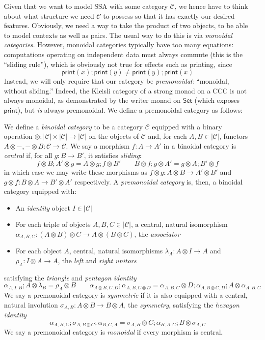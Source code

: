 \documentclass[acmsmall,screen,review]{acmart}
\newcommand{\mc}[1]{\ensuremath{\mathcal{#1}}}
\newcommand{\ms}[1]{\ensuremath{\mathsf{#1}}}
\begin{document}
Given that we want to model SSA with some category $\mc{C}$, we hence have to think about what
structure we need $\mc{C}$ to possess so that it has exactly our desired features. Obviously, we
need a way to take the product of two objects, to be able to model contexts as well as pairs.
% 
The usual way to do this is via \emph{monoidal categories}. 
%
However, monoidal categories typically have too many equations: 
%
computations operating on independent data must always commute (this is the ``sliding rule''), 
%
  which is obviously not true for effects such as printing, since
$$
\ms{print}(x) ; \ms{print}(y) \neq \ms{print}(y) ; \ms{print}(x)
$$
Instead, we will only require that our category be \emph{premonoidal}: ``monoidal, without
sliding.'' Indeed, the Kleisli category of a strong monad on a CCC is not always monoidal, as
demonstrated by the writer monad on $\ms{Set}$ (which exposes $\ms{print}$), but \emph{is} always
premonoidal. We define a premonoidal category as follows:
\begin{definition}
  We define a \emph{binoidal category} to be a category $\mc{C}$ equipped with a binary operation
  $\otimes : |\mc{C}| \times |\mc{C}| \to |\mc{C}|$ on the objects of $\mc{C}$ and, for each $A, B
  \in |\mc{C}|$, functors $A \otimes -, - \otimes B : \mc{C} \to \mc{C}$. We say a morphism $f : A
  \to A'$ in a binoidal category is \emph{central} if, for all $g : B \to B'$, it satisfies
  \emph{sliding}:
  $$
  f \otimes B ; A' \otimes g = A \otimes g ; f \otimes B' \qquad
  B \otimes f ; g \otimes A' = g \otimes A ; B' \otimes f
  $$
  in which case we may write these morphisms as $f \otimes g : A \otimes B \to A' \otimes B'$ and $g
  \otimes f : B \otimes A \to B' \otimes A'$ respectively. A \emph{premonoidal category} is, then, a
  binoidal category equipped with:
  \begin{itemize}
    \item An \emph{identity} object $I \in |\mc{C}|$
    \item For each triple of objects $A, B, C \in |\mc{C}|$, a central, natural isomorphism
    $\alpha_{A, B, C} : (A \otimes B) \otimes C \to A \otimes (B \otimes C)$, the \emph{associator}
    \item For each object $A$, central, natural isomorphisms $\lambda_A : A \otimes I \to A$ and
    $\rho_A : I \otimes A \to A$, the \emph{left} and \emph{right unitors}
  \end{itemize}
  satisfying the \emph{triangle} and \emph{pentagon identity}
  $$
  \alpha_{A, I, B} ; A \otimes \lambda_B = \rho_A \otimes B \qquad
  \alpha_{A \otimes B, C, D} ; \alpha_{A, B, C \otimes D}
  = \alpha_{A, B, C} \otimes D ; \alpha_{A, B \otimes C, D} ; A \otimes \alpha_{A, B, C}
  $$
  We say a premonoidal category is \emph{symmetric} if it is also equipped with a central, natural
  involution $\sigma_{A, B} : A \otimes B \to B \otimes A$, the \textit{symmetry}, satisfying the
  \emph{hexagon identity}
  $$
  \alpha_{A, B, C} ; \sigma_{A, B \otimes C} ; \alpha_{B, C, A}
  = \sigma_{A, B} \otimes C ; \alpha_{B, A, C} ; B \otimes \sigma_{A, C}
  $$
  We say a premonoidal category is \emph{monoidal} if every morphism is central.
\end{definition}
\end{document}
